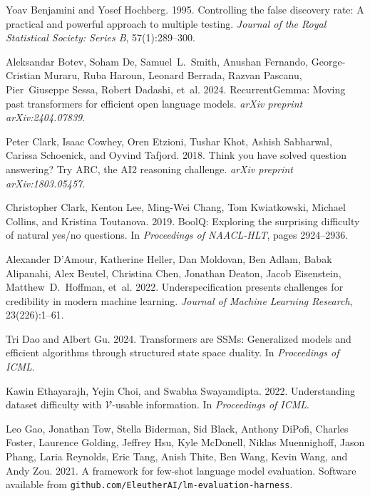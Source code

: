 \documentclass[11pt]{article}
\begin{document}
\begin{thebibliography}{}

Yoav Benjamini and Yosef Hochberg. 1995.
Controlling the false discovery rate: A practical and powerful approach to multiple testing.
\textit{Journal of the Royal Statistical Society: Series B}, 57(1):289--300.

Aleksandar Botev, Soham De, Samuel~L.\ Smith, Anushan Fernando, George-Cristian Muraru, Ruba Haroun, Leonard Berrada, Razvan Pascanu, Pier~Giuseppe Sessa, Robert Dadashi, et~al. 2024.
RecurrentGemma: Moving past transformers for efficient open language models.
\textit{arXiv preprint arXiv:2404.07839}.

Peter Clark, Isaac Cowhey, Oren Etzioni, Tushar Khot, Ashish Sabharwal, Carissa Schoenick, and Oyvind Tafjord. 2018.
Think you have solved question answering? Try ARC, the AI2 reasoning challenge.
\textit{arXiv preprint arXiv:1803.05457}.

Christopher Clark, Kenton Lee, Ming-Wei Chang, Tom Kwiatkowski, Michael Collins, and Kristina Toutanova. 2019.
BoolQ: Exploring the surprising difficulty of natural yes/no questions.
In \textit{Proceedings of NAACL-HLT}, pages 2924--2936.

Alexander D'Amour, Katherine Heller, Dan Moldovan, Ben Adlam, Babak Alipanahi, Alex Beutel, Christina Chen, Jonathan Deaton, Jacob Eisenstein, Matthew~D.\ Hoffman, et~al. 2022.
Underspecification presents challenges for credibility in modern machine learning.
\textit{Journal of Machine Learning Research}, 23(226):1--61.

Tri Dao and Albert Gu. 2024.
Transformers are SSMs: Generalized models and efficient algorithms through structured state space duality.
In \textit{Proceedings of ICML}.

Kawin Ethayarajh, Yejin Choi, and Swabha Swayamdipta. 2022.
Understanding dataset difficulty with $\mathcal{V}$-usable information.
In \textit{Proceedings of ICML}.

Leo Gao, Jonathan Tow, Stella Biderman, Sid Black, Anthony DiPofi, Charles Foster, Laurence Golding, Jeffrey Hsu, Kyle McDonell, Niklas Muennighoff, Jason Phang, Laria Reynolds, Eric Tang, Anish Thite, Ben Wang, Kevin Wang, and Andy Zou. 2021.
A framework for few-shot language model evaluation.
Software available from \texttt{github.com/EleutherAI/lm-evaluation-harness}.


\end{thebibliography}
\end{document}
